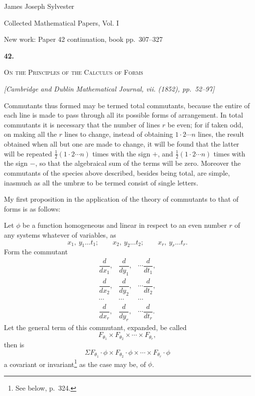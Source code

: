 \documentclass[11pt]{article}
\newcommand{\paperhead}[3]{%
  \clearpage
  \begin{center}
  {\Large\bfseries #1.}\par\vspace{0.85em}
  {\large\scshape #2}\par\vspace{0.6em}
  {\itshape [#3]}\par
  \end{center}\vspace{0.4em}}
\newcommand{\sourcepage}[1]{\marginpar{\scriptsize p.~#1}}
\begin{document}
\begin{center}
{\Large James Joseph Sylvester}\par\vspace{0.25em}
{\large Collected Mathematical Papers, Vol. I}\par\vspace{0.25em}
{\normalsize New work: Paper 42 continuation, book pp.~307--327}\par
\end{center}
\thispagestyle{empty}
\vspace{0.75em}

\paperhead{42}{On the Principles of the Calculus of Forms}{Cambridge and Dublin Mathematical Journal, vii. (1852), pp.~52--97}


\sourcepage{307}
Commutants thus formed may be termed total commutants, because the entire of each line is made to pass through all its possible forms of arrangement. In total commutants it is necessary that the number of lines $r$ be even; for if taken odd, on making all the $r$ lines to change, instead of obtaining $1\cdot2\cdots n$ lines, the result obtained when all but one are made to change, it will be found that the latter will be repeated $\frac12(1\cdot2\cdots n)$ times with the sign $+$, and $\frac12(1\cdot2\cdots n)$ times with the sign $-$, so that the algebraical sum of the terms will be zero. Moreover the commutants of the species above described, besides being total, are simple, inasmuch as all the umbræ to be termed consist of single letters.

My first proposition in the application of the theory of commutants to that of forms is as follows:

Let $\phi$ be a function homogeneous and linear in respect to an even number $r$ of any systems whatever of variables, as
\[
x_1,\ y_1\ldots t_1;\qquad x_2,\ y_2\ldots t_2;\qquad x_r,\ y_r\ldots t_r.
\]
Form the commutant
\[
\begin{array}{ccc}
\dfrac{d}{dx_1},&\dfrac{d}{dy_1},&\cdots\dfrac{d}{dt_1},\\[0.7em]
\dfrac{d}{dx_2},&\dfrac{d}{dy_2},&\cdots\dfrac{d}{dt_2},\\
\cdots&\cdots&\cdots\\[0.4em]
\dfrac{d}{dx_r},&\dfrac{d}{dy_r},&\cdots\dfrac{d}{dt_r}.
\end{array}
\]
Let the general term of this commutant, expanded, be called
\[
F_{\theta_1}\times F_{\theta_2}\times\cdots\times F_{\theta_r},
\]
then is
\[
\Sigma F_{\theta_1}\!\cdot\!\phi\times F_{\theta_2}\!\cdot\!\phi\times\cdots\times F_{\theta_r}\!\cdot\!\phi
\]
a covariant or invariant\footnote{See below, p.~324.} as the case may be, of $\phi$.
\end{document}
